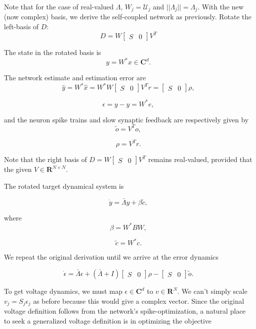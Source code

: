 Note that for the case of real-valued $\Lambda$, $W_j = \mathcal{U}_j$ and $||\Lambda_j|| = \Lambda_j$. With the new (now complex) basis, we derive the self-coupled network as previously. Rotate the left-basis of $D$:
$$
D = W \begin{bmatrix}
S & 0
\end{bmatrix}
V^T
$$


The state in the rotated basis is 
$$ y = W^* x \in \mathbf{C}^d.$$

The network estimate and estimation error are 
$$
\hat{y} = W^* \hat{x} = W^* W \begin{bmatrix} S & 0 \end{bmatrix} V^T r = \begin{bmatrix} S & 0 \end{bmatrix} \rho,
$$

$$
\epsilon = y-\hat{y} = W^* e,
$$

and the neuron spike trains and slow synaptic feedback are respectively given by
$$
\tilde{o} = V^T o,
$$

$$
\rho = V^T r.
$$

Note that the right basis of $D = W \begin{bmatrix}S & 0 \end{bmatrix} V^T$ remains real-valued, provided that the given  $V \in \mathbf{R}^{N \times N}$.

The rotated target dynamical system is

$$
\dot{y} = \bar{\Lambda} y + \beta \tilde{c},
$$

where 
$$
\beta = W^* B W,
$$

$$
\tilde{c} = W^* c.
$$

We repeat the original derivation until we arrive at the error dynamics 

$$
\dot{\epsilon}
= 
\bar{\Lambda} \epsilon
+
\left( 
\bar{\Lambda} + I
\right)
\begin{bmatrix}
S & 0
\end{bmatrix}
\rho
-
\begin{bmatrix}
S & 0
\end{bmatrix}
\tilde{o}.
$$

To get voltage dynamics, we must map $\epsilon \in \mathbf{C}^d$ to $v \in \mathbf{R}^{N}$. We can't simply scale $v_j = S_j \epsilon_j$ as before because this would give a complex vector. Since the original voltage definition follows from the network's spike-optimization, a natural place to seek a generalized voltage definition is in optimizing the objective

